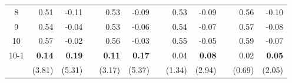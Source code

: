 \begin{singlespacing}
\begin{table}[H]
\begin{tabular}{crrrrrrrrrrr}
8    & 0.51          & -0.11         &  & 0.53          & -0.09         &  & 0.53   & -0.09         &  & 0.56   & -0.10         \\
9    & 0.54          & -0.04         &  & 0.53          & -0.06         &  & 0.54   & -0.07         &  & 0.57   & -0.08         \\
10   & 0.57          & -0.02         &  & 0.56          & -0.03         &  & 0.55   & -0.05         &  & 0.59   & -0.07         \\
10-1 & \textbf{0.14} & \textbf{0.19} &  & \textbf{0.11} & \textbf{0.17} &  & 0.04   & \textbf{0.08} &  & 0.02   & \textbf{0.05} \\
     & (3.81)        & (5.31)        &  & (3.17)        & (5.37)        &  & (1.34) & (2.94)        &  & (0.69) & (2.05)    \\ \hline
\end{tabular}
\end{table}
\end{singlespacing}

